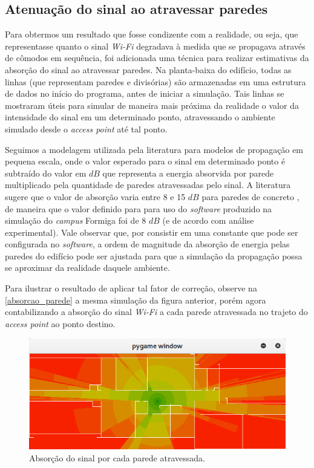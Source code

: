 \documentclass[
	12pt,				%
	twoside,			%
	a4paper,			%
	english,			%
	french,				%
	spanish,			%
	brazil				%
	]{abntex2}
\begin{document}
\subsection{Atenuação do sinal ao atravessar
paredes}\label{atenuauxe7uxe3o-do-sinal-ao-atravessar-paredes}

Para obtermos um resultado que fosse condizente com a realidade, ou
seja, que representasse quanto o sinal \emph{Wi-Fi} degradava à medida
que se propagava através de cômodos em sequência, foi adicionada uma
técnica para realizar estimativas da absorção do sinal ao atravessar
paredes. Na planta-baixa do edifício, todas as linhas (que representam
paredes e divisórias) são armazenadas em uma estrutura de dados no
início do programa, antes de iniciar a simulação. Tais linhas se
mostraram úteis para simular de maneira mais próxima da realidade o
valor da intensidade do sinal em um determinado ponto, atravessando o
ambiente simulado desde o \emph{access point} até tal ponto.

Seguimos a modelagem utilizada pela literatura para modelos de
propagação em pequena escala, onde o valor esperado para o sinal em
determinado ponto é subtraído do valor em \(dB\) que representa a
energia absorvida por parede multiplicado pela quantidade de paredes
atravessadas pelo sinal. A literatura sugere que o valor de absorção
varia entre 8 e 15 \(dB\) para paredes de concreto \cite{RAPPAPORT}, de
maneira que o valor definido para para uso do \emph{software} produzido
na simulação do \emph{campus} Formiga foi de 8 \(dB\) (e de acordo com
análise experimental). Vale observar que, por consistir em uma constante
que pode ser configurada no \emph{software}, a ordem de magnitude da
absorção de energia pelas paredes do edifício pode ser ajustada para que
a simulação da propagação possa se aproximar da realidade daquele
ambiente.

Para ilustrar o resultado de aplicar tal fator de correção, observe na
\autoref{absorcao_parede} a mesma simulação da figura anterior, porém
agora contabilizando a absorção do sinal \emph{Wi-Fi} a cada parede
atravessada no trajeto do \emph{access point} ao ponto destino.

\begin{figure}[ht]
    \caption{\label{absorcao_parede} Absorção do sinal por cada parede atravessada.}
    \begin{center}
        \includegraphics[scale=0.7]{imagens/absorcao-parede.jpg}
    \end{center}
\end{figure}
\end{document}
